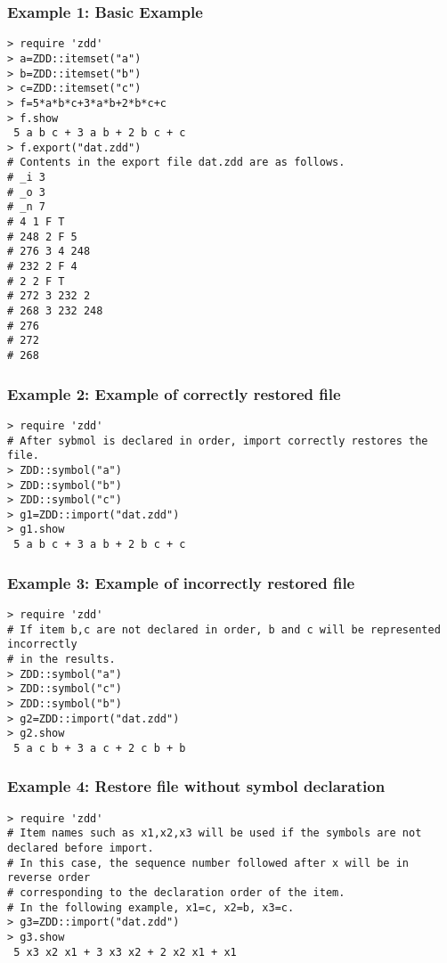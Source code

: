 \subsubsection*{Example 1: Basic Example}



\begin{Verbatim}[baselinestretch=0.7,frame=single]
> require 'zdd'
> a=ZDD::itemset("a")
> b=ZDD::itemset("b")
> c=ZDD::itemset("c")
> f=5*a*b*c+3*a*b+2*b*c+c
> f.show
 5 a b c + 3 a b + 2 b c + c
> f.export("dat.zdd")
# Contents in the export file dat.zdd are as follows. 
# _i 3
# _o 3
# _n 7
# 4 1 F T
# 248 2 F 5
# 276 3 4 248
# 232 2 F 4
# 2 2 F T
# 272 3 232 2
# 268 3 232 248
# 276
# 272
# 268

\end{Verbatim}
\subsubsection*{Example 2: Example of correctly restored file}



\begin{Verbatim}[baselinestretch=0.7,frame=single]
> require 'zdd'
# After sybmol is declared in order, import correctly restores the file. 
> ZDD::symbol("a")
> ZDD::symbol("b")
> ZDD::symbol("c")
> g1=ZDD::import("dat.zdd")
> g1.show
 5 a b c + 3 a b + 2 b c + c
\end{Verbatim}
\subsubsection*{Example 3: Example of incorrectly restored file}



\begin{Verbatim}[baselinestretch=0.7,frame=single]
> require 'zdd'
# If item b,c are not declared in order, b and c will be represented incorrectly
# in the results.
> ZDD::symbol("a")
> ZDD::symbol("c")
> ZDD::symbol("b")
> g2=ZDD::import("dat.zdd")
> g2.show
 5 a c b + 3 a c + 2 c b + b
\end{Verbatim}
\subsubsection*{Example 4: Restore file without symbol declaration}



\begin{Verbatim}[baselinestretch=0.7,frame=single]
> require 'zdd'
# Item names such as x1,x2,x3 will be used if the symbols are not declared before import. 
# In this case, the sequence number followed after x will be in reverse order
# corresponding to the declaration order of the item.
# In the following example, x1=c, x2=b, x3=c.
> g3=ZDD::import("dat.zdd")
> g3.show
 5 x3 x2 x1 + 3 x3 x2 + 2 x2 x1 + x1
\end{Verbatim}
